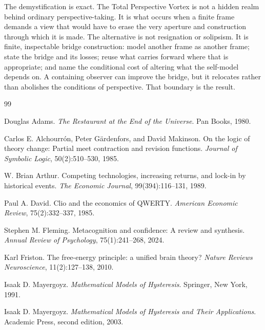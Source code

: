 \documentclass[11pt,a4paper]{article}
\theoremstyle{remark}
\begin{document}
The demystification is exact. The Total Perspective Vortex is not a hidden realm
behind ordinary perspective-taking. It is what occurs when a finite frame demands
a view that would have to erase the very aperture and construction through which
it is made. The alternative is not resignation or solipsism. It is finite,
inspectable bridge construction: model another frame as another frame; state the
bridge and its losses; reuse what carries forward where that is appropriate; and
name the conditional cost of altering what the self-model depends on. A
containing observer can improve the bridge, but it relocates rather than abolishes
the conditions of perspective. That boundary is the result.

\begin{thebibliography}{99}

Douglas Adams.
\newblock \emph{The Restaurant at the End of the Universe}.
\newblock Pan Books, 1980.

Carlos E. Alchourr\'on, Peter G\"ardenfors, and David Makinson.
\newblock On the logic of theory change: Partial meet contraction and revision functions.
\newblock \emph{Journal of Symbolic Logic}, 50(2):510--530, 1985.

W. Brian Arthur.
\newblock Competing technologies, increasing returns, and lock-in by historical events.
\newblock \emph{The Economic Journal}, 99(394):116--131, 1989.

Paul A. David.
\newblock Clio and the economics of QWERTY.
\newblock \emph{American Economic Review}, 75(2):332--337, 1985.

Stephen M. Fleming.
\newblock Metacognition and confidence: A review and synthesis.
\newblock \emph{Annual Review of Psychology}, 75(1):241--268, 2024.

Karl Friston.
\newblock The free-energy principle: a unified brain theory?
\newblock \emph{Nature Reviews Neuroscience}, 11(2):127--138, 2010.

Isaak D. Mayergoyz.
\newblock \emph{Mathematical Models of Hysteresis}.
\newblock Springer, New York, 1991.

Isaak D. Mayergoyz.
\newblock \emph{Mathematical Models of Hysteresis and Their Applications}.
\newblock Academic Press, second edition, 2003.


\end{thebibliography}
\end{document}
